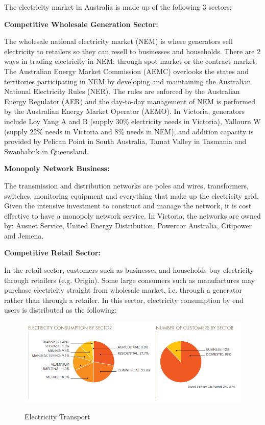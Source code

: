 \documentclass[12pt]{article}
\begin{document}
\begin{flushleft}
The electricity market in Australia is made up of the following 3 sectors:\par
{\textbf{\large Competitive Wholesale Generation Sector:}}\par
The wholesale national electricity market (NEM) is where generators sell electricity to retailers so they can resell to businesses and households. There are 2 ways in trading electricity in NEM: through spot market or the contract market.\parencite{aemc2} The Australian Energy Market Commission (AEMC) overlooks the states and territories participating in NEM by developing and maintaining the Australian National Electricity Rules (NER). The rules are enforced by the Australian Energy Regulator (AER) and the day-to-day management of NEM is performed by the Australian Energy Market Operator (AEMO).\parencite{aemo1} In Victoria, generators include Loy Yang A and B (supply 30\% electricity needs in Victoria), Yallourn W (supply 22\% needs in Victoria and 8\% needs in NEM), and addition capacity is provided by Pelican Point in South Australia, Tamat Valley in Tasmania and Swanbabnk in Queensland. \par
{\textbf{\large Monopoly Network Business:}}\par
The transmission and distribution networks are poles and wires, transformers, switches, monitoring equipment and everything that make up the electricity grid. Given the intensive investment to construct and manage the network, it is cost effective to have a monopoly network service.\parencite{aemc2} In Victoria, the networks are owned by: Ausnet Service, United Energy Distribution, Powercor Australia, Citipower and Jemena.\par
{\textbf{\large Competitive Retail Sector:}}\par
In the retail sector, customers such as businesses and households buy electricity through retailers (e.g. Origin). Some large consumers such as manufactures may purchase electricity straight from wholesale market, i.e. through a generator rather than through a retailer.\parencite{aemc2} In this sector, electricity consumption by end users is distributed as the following:
\begin{figure}[!h]
  \centering
  \includegraphics[width=\textwidth]{electricity_consumption.PNG}
    \caption{Electricity Transport}
    \parencite{aemo2}
\end{figure}
\end{flushleft}
\newpage
\end{document}
